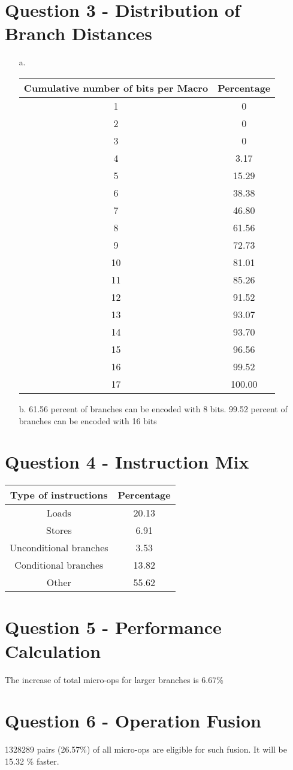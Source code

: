 \documentclass[12pt,letterpaper]{article}
\begin{document}
 \section*{Question 3 - Distribution of Branch Distances}
 \begin{itemize}
     \item[a.] 
     \begin{tabular}{|c|c|}
\hline 
Cumulative number of bits per Macro & Percentage \\ 
\hline 
1 & 0 \\ 
\hline 
2 & 0 \\ 
\hline 
3 & 0 \\ 
\hline 
4 & 3.17 \\ 
\hline 
5 & 15.29 \\ 
\hline 
6 & 38.38 \\ 
\hline 
7 & 46.80 \\ 
\hline 
8 & 61.56 \\ 
\hline 
9 & 72.73 \\ 
\hline 
10 & 81.01 \\ 
\hline 
11 & 85.26 \\ 
\hline 
12 & 91.52 \\ 
\hline 
13 & 93.07 \\ 
\hline 
14 & 93.70 \\ 
\hline 
15 & 96.56 \\ 
\hline 
16 & 99.52 \\ 
\hline 
17 & 100.00 \\ 
\hline 
\end{tabular} 
    \item[b.] 61.56 percent of branches can be encoded with 8 bits. 
    99.52 percent of branches can be encoded with 16 bits
 \end{itemize}
 \section*{Question 4 - Instruction Mix}
 \begin{tabular}{|c|c|}
\hline 
Type of instructions & Percentage \\ 
\hline 
Loads & 20.13 \\ 
\hline 
Stores & 6.91 \\ 
\hline 
Unconditional branches & 3.53 \\ 
\hline 
Conditional branches & 13.82 \\ 
\hline 
Other & 55.62 \\ 
\hline 
\end{tabular} 
 \section*{Question 5 - Performance Calculation}
 The increase of total micro-ops for larger branches is 6.67\%
 \section*{Question 6 - Operation Fusion}
 1328289 pairs (26.57\%) of all micro-ops are eligible for such fusion.
It will be 15.32 \% faster.
\end{document}
